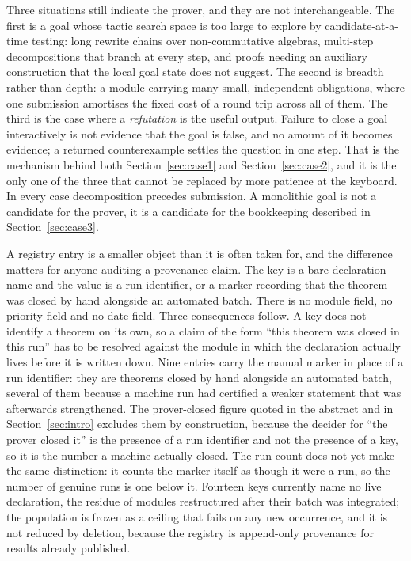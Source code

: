 \documentclass[11pt]{article}
\begin{document}
Three situations still indicate the prover, and they are not
interchangeable. The first is a goal whose tactic search space is too
large to explore by candidate-at-a-time testing: long rewrite chains
over non-commutative algebras, multi-step decompositions that branch
at every step, and proofs needing an auxiliary construction that the
local goal state does not suggest. The second is breadth rather than
depth: a module carrying many small, independent obligations, where
one submission amortises the fixed cost of a round trip across all of
them. The third is the case where a \emph{refutation} is the useful
output. Failure to close a goal interactively is not evidence that the
goal is false, and no amount of it becomes evidence; a returned
counterexample settles the question in one step. That is the mechanism
behind both Section~\ref{sec:case1} and Section~\ref{sec:case2}, and
it is the only one of the three that cannot be replaced by more
patience at the keyboard. In every case decomposition precedes
submission. A monolithic goal is not a candidate for the prover, it is
a candidate for the bookkeeping described in
Section~\ref{sec:case3}.

A registry entry is a smaller object than it is often taken for, and
the difference matters for anyone auditing a provenance claim. The key
is a bare declaration name and the value is a run identifier, or a
marker recording that the theorem was closed by hand alongside an
automated batch. There is no module field, no priority field and no
date field. Three consequences follow. A key does not identify
a theorem on its own, so a claim of the form ``this theorem was closed
in this run'' has to be resolved against the module in which the
declaration actually lives before it is written down. Nine entries
carry the manual marker in place of a run identifier: they are
theorems closed by hand alongside an automated batch, several of them
because a machine run had certified a weaker statement that was
afterwards strengthened. The prover-closed figure
\aristotleproved{} quoted in the abstract and in
Section~\ref{sec:intro} excludes them by construction, because the
decider for ``the prover closed it'' is the presence of a run
identifier and not the presence of a key, so it is the number a machine
actually closed. The run count \aristotleruns{} does not yet make the
same distinction: it counts the marker itself as though it were a
run, so the number of genuine runs is one below it. Fourteen keys currently name no live
declaration, the residue of modules restructured after their batch was
integrated; the population is frozen as a ceiling that fails on any
new occurrence, and it is not reduced by deletion, because the
registry is append-only provenance for results already published.
\end{document}
